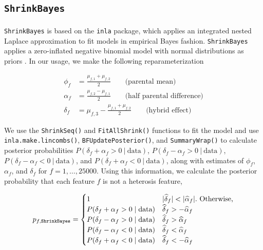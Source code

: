\documentclass{article}
\providecommand{\wh}[1]{\widehat{#1}}
\begin{document}
\begin{flushleft}
\section{{\tt ShrinkBayes}}

\paragraph{} {\tt ShrinkBayes} is based on the {\tt inla} package, which applies an integrated nested Laplace approximation to fit models in empirical Bayes fashion. {\tt ShrinkBayes} applies a zero-inflated negative binomial model with normal distributions as priors \cite{ShrinkBayes}. In our usage, we make the following reparameterization

\begin{align*}
\phi_f &= \frac{\mu_{f, 1} + \mu_{f, 2}}{2} \qquad \text{(parental mean)} \\
\alpha_f &= \frac{\mu_{f, 2} - \mu_{f, 1}}{2} \qquad \text{(half parental difference)} \\
\delta_f &= \mu_{f, 3} - \frac{\mu_{f, 1} + \mu_{f, 2}}{2} \qquad \text{(hybrid effect)} 
\end{align*}

We use the {\tt ShrinkSeq()} and {\tt FitAllShrink()} functions to fit the model and use {\tt inla.make.lincombs()}, {\tt BFUpdatePosterior()}, and {\tt SummaryWrap()} to calculate posterior probabilities $P(\delta_f + \alpha_f > 0 \ | \ \text{data})$, $P(\delta_f - \alpha_f > 0 \ | \ \text{data})$, $P(\delta_f - \alpha_f < 0 \ | \ \text{data})$, and $P(\delta_f + \alpha_f < 0 \ | \ \text{data})$, along with estimates of $\phi_f$, $\alpha_f$, and $\delta_f$ for $f = 1, \ldots, 25000$. Using this information, we calculate the posterior probability that each feature $f$ is not a heterosis feature,


\begin{align*}
p_{f, {\tt ShrinkBayes}} = \begin{cases}
1 & |\wh{\delta}_f| < |\wh{\alpha}_f|. \text{ Otherwise,} \\
P(\delta_f + \alpha_f > 0 \mid \text{data}) & \wh{\delta}_f > - \wh{\alpha}_f \\ 
P(\delta_f - \alpha_f > 0 \mid \text{data}) & \wh{\delta}_f > \wh{\alpha}_f \\ 
P(\delta_f - \alpha_f < 0 \mid \text{data}) & \wh{\delta}_f < \wh{\alpha}_f \\ 
P(\delta_f + \alpha_f < 0 \mid \text{data}) & \wh{\delta}_f < - \wh{\alpha}_f \\ 
\end{cases}
\end{align*}


\end{flushleft}
\end{document}
